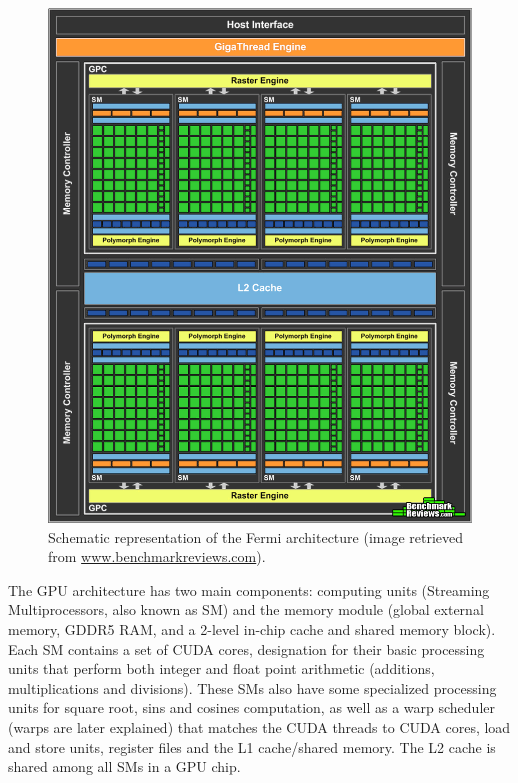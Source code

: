 \begin{figure}[!htp]
	\begin{center}
		\includegraphics[scale=0.3]{../../common/img/fermi_arch.png}
		\caption{Schematic representation of the \nvidia Fermi architecture (image retrieved from \url{www.benchmarkreviews.com}).}
		\label{fig:FermiArchitecture}
	\end{center}
\end{figure}

The \nvidia GPU architecture has two main components: computing units (Streaming Multiprocessors, also known as SM) and the memory module (global external memory, GDDR5 RAM, and a 2-level in-chip cache and shared memory block). Each SM contains a set of CUDA cores, \nvidia designation for their basic processing units that perform both integer and float point arithmetic (additions, multiplications and divisions). These SMs also have some specialized processing units for square root, sins and cosines computation, as well as a warp scheduler (warps are later explained) that matches the CUDA threads to CUDA cores, load and store units, register files and the L1 cache/shared memory. The L2 cache is shared among all SMs in a GPU chip.

